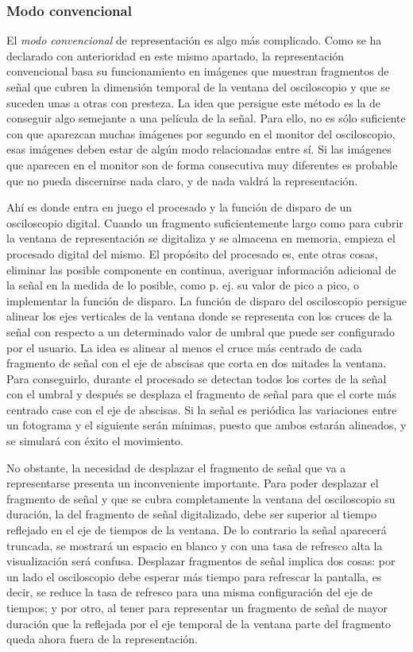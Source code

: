 \subsubsection{Modo convencional}

El \emph{modo convencional} de representación es algo más complicado. Como se ha declarado con anterioridad en este mismo apartado, la representación convencional basa su funcionamiento en imágenes que muestran fragmentos de señal que cubren la dimensión temporal de la ventana del osciloscopio y que se suceden unas a otras con presteza. La idea que persigue este método es la de conseguir algo semejante a una película de la señal. Para ello, no es sólo suficiente con que aparezcan muchas imágenes por segundo en el monitor del osciloscopio, esas imágenes deben estar de algún modo relacionadas entre sí. Si las imágenes que aparecen en el monitor son de forma consecutiva muy diferentes es probable que no pueda discernirse nada claro, y de nada valdrá la representación.\par
Ahí es donde entra en juego el procesado y la función de disparo de un osciloscopio digital. Cuando un fragmento suficientemente largo como para cubrir la ventana de representación se digitaliza y se almacena en memoria, empieza el procesado digital del mismo. El propósito del procesado es, ente otras cosas, eliminar las posible componente en continua, averiguar información adicional de la señal en la medida de lo posible, como p. ej. su valor de pico a pico, o implementar la función de disparo. La función de disparo del osciloscopio persigue alinear los ejes verticales de la ventana donde se representa con los cruces de la señal con respecto a un determinado valor de umbral que puede ser configurado por el usuario. La idea es alinear al menos el cruce más centrado de cada fragmento de señal con el eje de abscisas que corta en dos mitades la ventana. Para conseguirlo, durante el procesado se detectan todos los cortes de la señal con el umbral y después se desplaza el fragmento de señal para que el corte más centrado case con el eje de abscisas. Si la señal es periódica las variaciones entre un fotograma y el siguiente serán mínimas, puesto que ambos estarán alineados, y se simulará con éxito el movimiento.\par
No obstante, la necesidad de desplazar el fragmento de señal que va a representarse presenta un inconveniente importante. Para poder desplazar el fragmento de señal y que se cubra completamente la ventana del osciloscopio su duración, la del fragmento de señal digitalizado, debe ser superior al tiempo reflejado en el eje de tiempos de la ventana. De lo contrario la señal aparecerá truncada, se mostrará un espacio en blanco y con una tasa de refresco alta la visualización será confusa. Desplazar fragmentos de señal implica dos cosas: por un lado el osciloscopio debe esperar más tiempo para refrescar la pantalla, es decir, se reduce la tasa de refresco para una misma configuración del eje de tiempos; y por otro, al tener para representar un fragmento de señal de mayor duración que la reflejada por el eje temporal de la ventana parte del fragmento queda ahora fuera de la representación.\par
